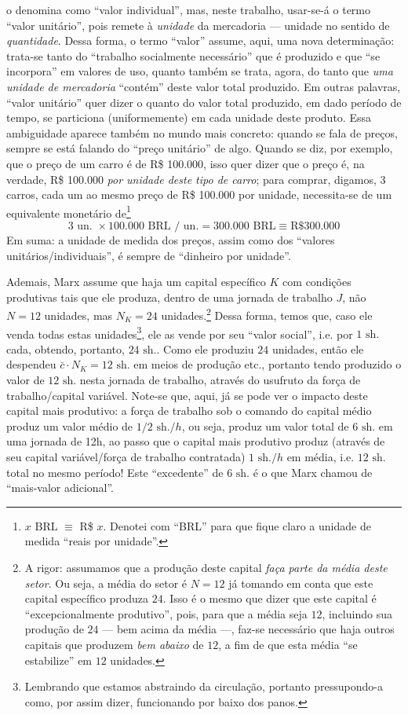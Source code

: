 \textcite{Marx2017} o denomina como ``valor individual'', mas, neste trabalho, usar-se-á o termo ``valor unitário'', pois remete à \textit{unidade} da mercadoria --- unidade no sentido de \textit{quantidade}. Dessa forma, o termo ``valor'' assume, aqui, uma nova determinação: trata-se tanto do ``trabalho socialmente necessário'' que é produzido e que ``se incorpora'' em valores de uso, quanto também se trata, agora, do tanto que \textit{uma unidade de mercadoria} ``contém'' deste valor total produzido. Em outras palavras, ``valor unitário'' quer dizer o quanto do valor total produzido, em dado período de tempo, se particiona (uniformemente) em cada unidade deste produto. Essa ambiguidade aparece também no mundo mais concreto: quando se fala de preços, sempre se está falando do ``preço unitário'' de algo. Quando se diz, por exemplo, que o preço de um carro é de R\$ 100.000, isso quer dizer que o preço é, na verdade, R\$ 100.000 \textit{por unidade deste tipo de carro}; para comprar, digamos, 3 carros, cada um ao mesmo preço de R\$ 100.000 por unidade, necessita-se de um equivalente monetário de\footnote{$x\text{ BRL}$ $\equiv$ R\$ $x$. Denotei com ``BRL'' para que fique claro a unidade de medida ``reais por unidade''.} 
$$
3\text{ un. } \times 100.000\text{ BRL / un.} = 300.000\text{ BRL} \equiv \text{R\$ } 300.000
$$
Em suma: a unidade de medida dos preços, assim como dos ``valores unitários/individuais'', é sempre de ``dinheiro por unidade''. 

Ademais, Marx assume que haja um capital específico $K$ com condições produtivas tais que ele produza, dentro de uma jornada de trabalho $J$, não $N=12$ unidades, mas $N_K = 24$ unidades.\footnote{A rigor: assumamos que a produção deste capital \textit{faça parte da média deste setor}. Ou seja, a média do setor é $N=12$ já tomando em conta que este capital específico produza $24$. Isso é o mesmo que dizer que este capital é ``excepcionalmente produtivo'', pois, para que a média seja $12$, incluindo sua produção de $24$ --- bem acima da média ---, faz-se necessário que haja outros capitais que produzem \textit{bem abaixo} de $12$, a fim de que esta média ``se estabilize'' em $12$ unidades.} Dessa forma, temos que, caso ele venda todas estas unidades\footnote{Lembrando que estamos abstraindo da circulação, portanto pressupondo-a como, por assim dizer, funcionando por baixo dos panos.}, ele as vende por seu ``valor social'', i.e. por $1\text{ sh.}$ cada, obtendo, portanto, $24\text{ sh.}$. Como ele produziu $24$ unidades, então ele despendeu $\bar{c} \cdot N_K = 12\text{ sh.}$ em meios de produção etc., portanto tendo produzido o valor de $12\text{ sh.}$ nesta jornada de trabalho, através do usufruto da força de trabalho/capital variável. Note-se que, aqui, já se pode ver o impacto deste capital mais produtivo: a força de trabalho sob o comando do capital médio produz um valor médio de $1/2\text{ sh.}/h$, ou seja, produz um valor total de $6\text{ sh.}$ em uma jornada de 12h, ao passo que o capital mais produtivo produz (através de seu capital variável/força de trabalho contratada) $1\text{ sh.}/h$ em média, i.e. $12\text{ sh.}$ total no mesmo período! Este ``excedente'' de $6 \text{ sh.}$ é o que Marx chamou de ``mais-valor adicional''.

